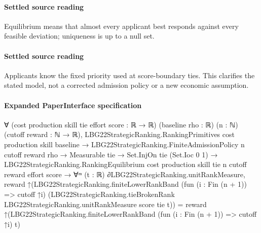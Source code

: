 \documentclass[10pt]{article}
\begin{document}
\paragraph{Settled source reading}
\begin{sloppypar}
Equilibrium means that almost every applicant best responds against every feasible deviation;\allowbreak{} uniqueness is up to a null set.\allowbreak{}
\end{sloppypar}
\paragraph{Settled source reading}
\begin{sloppypar}
Applicants know the fixed priority used at score-\allowbreak{}boundary ties.\allowbreak{} This clarifies the stated model, not a corrected admission policy or a new economic assumption.\allowbreak{}
\end{sloppypar}

\paragraph{Expanded PaperInterface specification}
\begin{ReviewVerbatim}
∀ (cost production skill tie effort score : ℝ → ℝ) (baseline rho : ℝ) (n : ℕ) (cutoff reward : ℕ → ℝ),
  LBG22StrategicRanking.RankingPrimitives cost production skill baseline →
    LBG22StrategicRanking.FiniteAdmissionPolicy n cutoff reward rho →
      Measurable tie →
        Set.InjOn tie (Set.Ioc 0 1) →
          LBG22StrategicRanking.RankingEquilibrium cost production skill tie n cutoff reward effort score →
            ∀ᵐ (t : ℝ) ∂LBG22StrategicRanking.unitRankMeasure,
              reward
                  ↑(LBG22StrategicRanking.finiteLowerRankBand (fun (i : Fin (n + 1)) => cutoff ↑i)
                      (LBG22StrategicRanking.tieBrokenRank LBG22StrategicRanking.unitRankMeasure score tie t)) =
                reward ↑(LBG22StrategicRanking.finiteLowerRankBand (fun (i : Fin (n + 1)) => cutoff ↑i) t)
\end{ReviewVerbatim}
\end{document}
